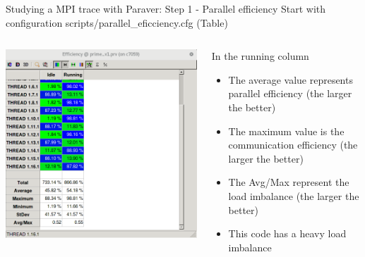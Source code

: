 \documentclass[10pt,xcolor=table]{beamer}
\begin{document}
\begin{frame}{Studying a MPI trace with Paraver: Step 1 - Parallel efficiency}
Start with configuration scripts/parallel\_eficciency.cfg (Table)

\begin{columns}
\begin{column}{0.5\textwidth}
  \includegraphics[width=\textwidth]{figs/parallel_efficiency_table.png}
\end{column}
\begin{column}{0.5\textwidth}
In the running column
  \begin{itemize}
      \item The average value represents parallel efficiency (the larger the better)
      \item The maximum value is the communication efficiency (the larger the better)
      \item The Avg/Max represent the load imbalance (the larger the better)
      \item This code has a heavy load imbalance
  \end{itemize}
\end{column}
\end{columns}
\end{frame}
\end{document}
